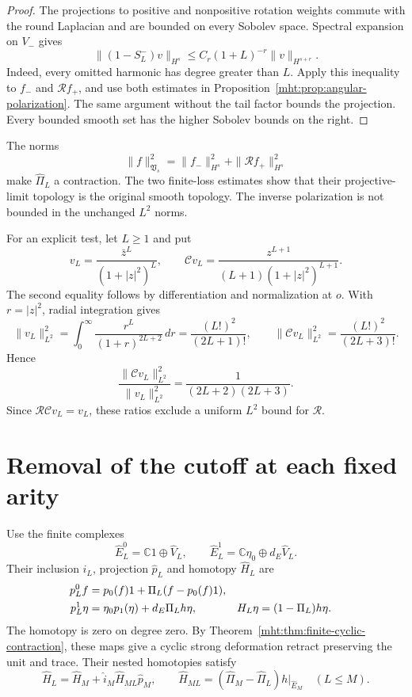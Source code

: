 \begin{proof}
The projections to positive and nonpositive rotation weights commute
with the round Laplacian and are bounded on every Sobolev space.
Spectral expansion on $V_-$ gives
\[
 \|(1-S_L^-)v\|_{H^s}
       \leq C_r(1+L)^{-r}\|v\|_{H^{s+r}}.
\]
Indeed, every omitted harmonic has degree greater than $L$.
Apply this inequality to $f_-$ and $\mathcal Rf_+$, and use both
estimates in Proposition~\ref{mht:prop:angular-polarization}.
The same argument without the tail factor bounds the projection.
Every bounded smooth set has the higher Sobolev bounds on the right.
\end{proof}

The norms
\begin{equation}\label{mht:eq:angular-adapted-norm}
 \|f\|_{\mathfrak V_s}^2
       =\|f_-\|_{H^s}^2+\|\mathcal Rf_+\|_{H^s}^2
\end{equation}
make $\widehat\Pi_L$ a contraction. The two finite-loss estimates
show that their projective-limit topology is the original smooth
topology. The inverse polarization is not bounded in the unchanged
$L^2$ norms.

For an explicit test, let $L\geq1$ and put
\[
 v_L=\frac{\bar z^L}{(1+|z|^2)^L},\qquad
 \mathcal Cv_L=\frac{z^{L+1}}{(L+1)(1+|z|^2)^{L+1}}.
\]
The second equality follows by differentiation and normalization at
$o$. With $r=|z|^2$, radial integration gives
\[
 \|v_L\|_{L^2}^2
  =\int_0^\infty\frac{r^L}{(1+r)^{2L+2}}\,dr
  =\frac{(L!)^2}{(2L+1)!},\qquad
 \|\mathcal Cv_L\|_{L^2}^2=\frac{(L!)^2}{(2L+3)!}.
\]
Hence
\begin{equation}\label{mht:eq:angular-conditioning}
 \frac{\|\mathcal Cv_L\|_{L^2}^2}{\|v_L\|_{L^2}^2}
       =\frac1{(2L+2)(2L+3)}.
\end{equation}
Since $\mathcal R\mathcal Cv_L=v_L$, these ratios exclude a uniform
$L^2$ bound for $\mathcal R$.

\section{Removal of the cutoff at each fixed arity}

Use the finite complexes
\[
 \widehat E_L^0=\mathbb C1\oplus\widehat V_L,
 \qquad
 \widehat E_L^1=\mathbb C\eta_0\oplus d_E\widehat V_L.
\]
Their inclusion $\widehat i_L$, projection $\widehat p_L$ and
homotopy $\widehat H_L$ are
\begin{align}
 \widehat p_L^0f&=p_0(f)1+
                    \widehat\Pi_L(f-p_0(f)1),\notag\\
 \widehat p_L^1\eta&=\eta_0p_1(\eta)
                        +d_E\widehat\Pi_Lh\eta,&
 \widehat H_L\eta&=(1-\widehat\Pi_L)h\eta.
 \label{mht:eq:angular-contraction}
\end{align}
The homotopy is zero on degree zero. By
Theorem~\ref{mht:thm:finite-cyclic-contraction}, these maps give a
cyclic strong deformation retract preserving the unit and trace.
Their nested homotopies satisfy
\[
 \widehat H_L=\widehat H_M+
                \widehat i_M\widehat H_{ML}\widehat p_M,
 \qquad
 \widehat H_{ML}=(\widehat\Pi_M-\widehat\Pi_L)h|_{\widehat E_M}
 \quad(L\leq M).
\]

